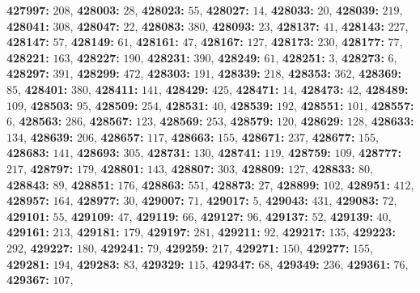 \textsf{\bfseries 427997:} $208$, \textsf{\bfseries 428003:} $28$, \textsf{\bfseries 428023:} $55$, \textsf{\bfseries 428027:} $14$, \textsf{\bfseries 428033:} $20$, \textsf{\bfseries 428039:} $219$, \textsf{\bfseries 428041:} $308$, \textsf{\bfseries 428047:} $22$, \textsf{\bfseries 428083:} $380$, \textsf{\bfseries 428093:} $23$, \textsf{\bfseries 428137:} $41$, \textsf{\bfseries 428143:} $227$, \textsf{\bfseries 428147:} $57$, \textsf{\bfseries 428149:} $61$, \textsf{\bfseries 428161:} $47$, \textsf{\bfseries 428167:} $127$, \textsf{\bfseries 428173:} $230$, \textsf{\bfseries 428177:} $77$, \textsf{\bfseries 428221:} $163$, \textsf{\bfseries 428227:} $190$, \textsf{\bfseries 428231:} $390$, \textsf{\bfseries 428249:} $61$, \textsf{\bfseries 428251:} $3$, \textsf{\bfseries 428273:} $6$, \textsf{\bfseries 428297:} $391$, \textsf{\bfseries 428299:} $472$, \textsf{\bfseries 428303:} $191$, \textsf{\bfseries 428339:} $218$, \textsf{\bfseries 428353:} $362$, \textsf{\bfseries 428369:} $85$, \textsf{\bfseries 428401:} $380$, \textsf{\bfseries 428411:} $141$, \textsf{\bfseries 428429:} $425$, \textsf{\bfseries 428471:} $14$, \textsf{\bfseries 428473:} $42$, \textsf{\bfseries 428489:} $109$, \textsf{\bfseries 428503:} $95$, \textsf{\bfseries 428509:} $254$, \textsf{\bfseries 428531:} $40$, \textsf{\bfseries 428539:} $192$, \textsf{\bfseries 428551:} $101$, \textsf{\bfseries 428557:} $6$, \textsf{\bfseries 428563:} $286$, \textsf{\bfseries 428567:} $123$, \textsf{\bfseries 428569:} $253$, \textsf{\bfseries 428579:} $120$, \textsf{\bfseries 428629:} $128$, \textsf{\bfseries 428633:} $134$, \textsf{\bfseries 428639:} $206$, \textsf{\bfseries 428657:} $117$, \textsf{\bfseries 428663:} $155$, \textsf{\bfseries 428671:} $237$, \textsf{\bfseries 428677:} $155$, \textsf{\bfseries 428683:} $141$, \textsf{\bfseries 428693:} $305$, \textsf{\bfseries 428731:} $130$, \textsf{\bfseries 428741:} $119$, \textsf{\bfseries 428759:} $109$, \textsf{\bfseries 428777:} $217$, \textsf{\bfseries 428797:} $179$, \textsf{\bfseries 428801:} $143$, \textsf{\bfseries 428807:} $303$, \textsf{\bfseries 428809:} $127$, \textsf{\bfseries 428833:} $80$, \textsf{\bfseries 428843:} $89$, \textsf{\bfseries 428851:} $176$, \textsf{\bfseries 428863:} $551$, \textsf{\bfseries 428873:} $27$, \textsf{\bfseries 428899:} $102$, \textsf{\bfseries 428951:} $412$, \textsf{\bfseries 428957:} $164$, \textsf{\bfseries 428977:} $30$, \textsf{\bfseries 429007:} $71$, \textsf{\bfseries 429017:} $5$, \textsf{\bfseries 429043:} $431$, \textsf{\bfseries 429083:} $72$, \textsf{\bfseries 429101:} $55$, \textsf{\bfseries 429109:} $47$, \textsf{\bfseries 429119:} $66$, \textsf{\bfseries 429127:} $96$, \textsf{\bfseries 429137:} $52$, \textsf{\bfseries 429139:} $40$, \textsf{\bfseries 429161:} $213$, \textsf{\bfseries 429181:} $179$, \textsf{\bfseries 429197:} $281$, \textsf{\bfseries 429211:} $92$, \textsf{\bfseries 429217:} $135$, \textsf{\bfseries 429223:} $292$, \textsf{\bfseries 429227:} $180$, \textsf{\bfseries 429241:} $79$, \textsf{\bfseries 429259:} $217$, \textsf{\bfseries 429271:} $150$, \textsf{\bfseries 429277:} $155$, \textsf{\bfseries 429281:} $194$, \textsf{\bfseries 429283:} $83$, \textsf{\bfseries 429329:} $115$, \textsf{\bfseries 429347:} $68$, \textsf{\bfseries 429349:} $236$, \textsf{\bfseries 429361:} $76$, \textsf{\bfseries 429367:} $107$, 
